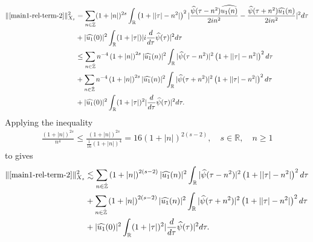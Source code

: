 \documentclass[12pt,reqno]{amsart}
\numberwithin{equation}{section}  %
\renewcommand{\cref}{\Cref}
\newcommand{\rr}{\mathbb{R}}
\newcommand{\zz}{\mathbb{Z}}
\newcommand{\wh}{\widehat}
\begin{document}
\begin{equation}
  \begin{split}
    \| \cref{main1-rel-term-2} \|_{X_{s}}^{2} 
    & = \sum_{n \in \zz}(1 + |n|)^{2s} \int_{\rr}\left( 1 + | | \tau
    |-n^{2} | \right)^{2} | \frac{\wh{\psi}(\tau - n^{2})\wh{u_{1}(n)}}{2i
    n^{2}} -
    \frac{\wh{\psi}(\tau + n^{2})\wh{u_{1}}(n)}{2i n^{2}} |^{2} d \tau
    \\
    & + |\wh{u_{1}}(0)|^{2} \int_{\rr} (1 + | \tau |) | i \frac{d}{d \tau}
    \wh{\psi}(\tau)|^{2} d \tau
    \\
    & \le \sum_{n \in \dot{\zz}} n^{-4} \left( 1 + |n| \right)^{2s} | \wh{u_{1}}(n)
    |^{2} \int_{\rr} | \wh{\psi}(\tau - n^{2}) |^{2}\left( 1 + | | \tau | -
    n^{2} | \right)^{2} d \tau
    \\
    & + \sum_{n \in \dot{\zz}} n^{-4} \left( 1 + |n| \right)^{2s} | \wh{u_{1}}(n)
    |^{2} \int_{\rr} | \wh{\psi}(\tau + n^{2}) |^{2}\left( 1 + | | \tau | -
    n^{2} | \right)^{2} d \tau
    \\
    & + |\wh{u_{1}}(0)|^{2} \int_{\rr} (1 + | \tau |)^{2} |\frac{d}{d \tau}
    \wh{\psi}(\tau)|^2 d \tau.
\end{split}
\label{u-1-norm-comp-pre}
\end{equation}
%
%
Applying the inequality
%
%
\begin{equation*}
\begin{split}
  \frac{(1 + |n|)^{2s}}{n^{4}} \le \frac{(1 + |n|)^{2s}}{\frac{1}{16}(1 +
  |n|)^{4}} = 16 (1 + | n |)^{2(s-2)},  \quad s \in \rr, \quad n \ge 1
\end{split}
\end{equation*}
%
to \cref{u-1-norm-comp-pre} gives
%
\begin{equation}
  \begin{split}
    \|  \cref{main1-rel-term-2}\|_{X_{s}}^{2} 
    & \lesssim \sum_{n \in \dot{\zz}} \left( 1 + |n| \right)^{2(s-2)} | \wh{u_{1}}(n)
    |^{2} \int_{\rr} | \wh{\psi}(\tau - n^{2}) |^{2}\left( 1 + | | \tau | -
    n^{2} | \right)^{2} d \tau
    \\
    & + \sum_{n \in \dot{\zz}} \left( 1 + |n| \right)^{2(s-2)} | \wh{u_{1}}(n)
    |^{2} \int_{\rr} | \wh{\psi}(\tau + n^{2}) |^{2}\left( 1 + | | \tau | -
    n^{2} | \right)^{2} d \tau
    \\
    & + |\wh{u_{1}}(0)|^{2} \int_{\rr} (1 + | \tau |)^{2} |\frac{d}{d \tau}
    \wh{\psi}(\tau)|^2 d \tau.
\end{split}
\label{u-1-norm-comp}
\end{equation}
\end{document}
